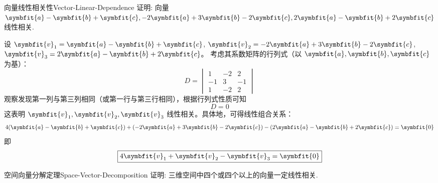 \begin{problem}{向量线性相关性}{Vector-Linear-Dependence}
    证明: 向量 $\symbfit{a} - \symbfit{b} + \symbfit{c}, -2\symbfit{a} + 3\symbfit{b} - 2\symbfit{c}, 2\symbfit{a} - \symbfit{b} + 2\symbfit{c}$ 线性相关.
\end{problem}

\begin{myproof}
    设 $\symbfit{v}_1 = \symbfit{a} - \symbfit{b} + \symbfit{c}$, $\symbfit{v}_2 = -2\symbfit{a} + 3\symbfit{b} - 2\symbfit{c}$, $\symbfit{v}_3 = 2\symbfit{a} - \symbfit{b} + 2\symbfit{c}$。
    考虑其系数矩阵的行列式（以 $\symbfit{a}, \symbfit{b}, \symbfit{c}$ 为基）：
    \begin{equation}
        D = \begin{vmatrix} 1 & -2 & 2 \\ -1 & 3 & -1 \\ 1 & -2 & 2 \end{vmatrix}
    \end{equation}
    观察发现第一列与第三列相同（或第一行与第三行相同），根据行列式性质可知
    \begin{equation}
        D = 0
    \end{equation}
    这表明 $\symbfit{v}_1, \symbfit{v}_2, \symbfit{v}_3$ 线性相关。具体地，可得线性组合关系：
    \begin{equation}
        4(\symbfit{a} - \symbfit{b} + \symbfit{c}) + (-2\symbfit{a} + 3\symbfit{b} - 2\symbfit{c}) - (2\symbfit{a} - \symbfit{b} + 2\symbfit{c}) = \symbfit{0}
    \end{equation}
    即
    \begin{equation}
        \boxed{4\symbfit{v}_1 + \symbfit{v}_2 - \symbfit{v}_3 = \symbfit{0}}
    \end{equation}
\end{myproof}


\begin{problem}{空间向量分解定理}{Space-Vector-Decomposition}
    证明: 三维空间中四个或四个以上的向量一定线性相关.
\end{problem}

